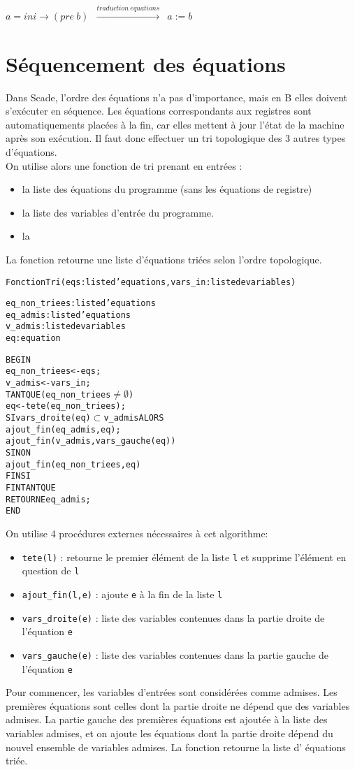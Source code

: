 \texttt{$a = ini \rightarrow (pre ~b)$ $\xrightarrow{traduction ~ equations}$ $a := b$ }

\section*{Séquencement des équations}

Dans Scade, l'ordre des équations n'a pas d'importance, mais en B elles doivent
s'exécuter en séquence. Les équations correspondants aux registres sont
automatiquements placées à la fin, car elles mettent à jour l'état de la machine
après son exécution. Il faut donc effectuer un tri topologique des 3 autres
types d'équations.\\
On utilise alors une fonction de tri prenant en entrées :
\begin{itemize}
\item la liste des équations du programme (sans les équations de registre)
\item la liste des variables d'entrée du programme. 
\item la
\end{itemize}
La fonction retourne une liste d'équations triées selon l'ordre
topologique.

\begin{alltt}
Fonction Tri (eqs: liste d'equations, vars\_in: liste de variables)

eq\_non\_triees : liste d'equations
eq\_admis : liste d'equations
v\_admis : liste de variables 
eq : equation

BEGIN
 eq\_non\_triees <- eqs;
 v\_admis <- vars\_in;
 TANT QUE (eq\_non\_triees \(\neq \emptyset \)) 
    eq <- tete(eq\_non\_triees);
    SI vars\_droite(eq) \(\subset\) v\_admis ALORS
       ajout\_fin(eq\_admis, eq);
       ajout\_fin(v\_admis, vars\_gauche(eq))
    SINON
       ajout\_fin(eq\_non\_triees, eq)
    FIN SI
 FIN TANT QUE
 RETOURNE eq\_admis;
END

\end{alltt}

On utilise 4 procédures externes nécessaires à cet algorithme:
\begin{itemize}
\item \texttt{tete(l)} : retourne le premier élément de la liste \texttt{l} et supprime l'élément
  en question de \texttt{l}
\item \texttt{ajout\_fin(l,e)} : ajoute \texttt{e} à la fin de la liste \texttt{l}
\item \texttt{vars\_droite(e)} : liste des variables contenues dans la partie droite de
  l'équation \texttt{e}
\item \texttt{vars\_gauche(e)} : liste des variables contenues dans la partie gauche de
  l'équation \texttt{e}
\end{itemize}
Pour commencer, les variables d'entrées sont considérées comme admises. Les
premières équations sont celles dont la partie droite ne dépend que des
variables admises. La partie gauche des premières équations est ajoutée à la
liste des variables admises, et on ajoute les équations dont la partie droite
dépend du nouvel ensemble de variables admises. La fonction retourne la liste d'
équations triée.

